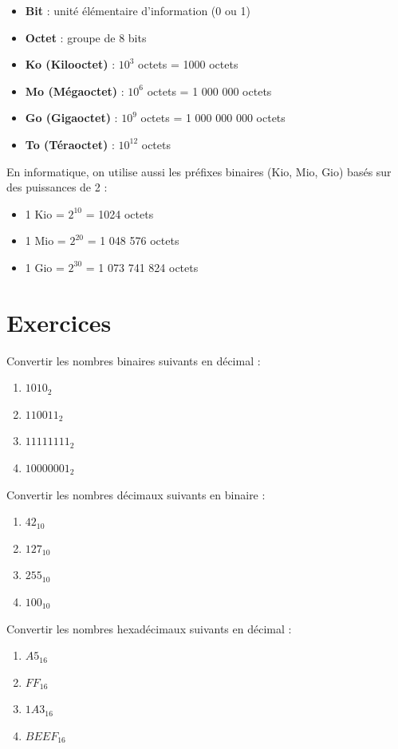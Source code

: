 \begin{definition}[Unités]
\begin{itemize}
    \item \textbf{Bit} : unité élémentaire d'information (0 ou 1)
    \item \textbf{Octet} : groupe de 8 bits
    \item \textbf{Ko (Kilooctet)} : $10^3$ octets = 1000 octets
    \item \textbf{Mo (Mégaoctet)} : $10^6$ octets = 1 000 000 octets
    \item \textbf{Go (Gigaoctet)} : $10^9$ octets = 1 000 000 000 octets
    \item \textbf{To (Téraoctet)} : $10^{12}$ octets
\end{itemize}
En informatique, on utilise aussi les préfixes binaires (Kio, Mio, Gio) basés sur des puissances de 2 :
\begin{itemize}
    \item 1 Kio = $2^{10}$ = 1024 octets
    \item 1 Mio = $2^{20}$ = 1 048 576 octets
    \item 1 Gio = $2^{30}$ = 1 073 741 824 octets
\end{itemize}
\end{definition}

\section{Exercices}


\exo{}
Convertir les nombres binaires suivants en décimal :
\begin{enumerate}
    \item $1010_2$
    \item $110011_2$
    \item $11111111_2$
    \item $10000001_2$
\end{enumerate}

\exo{}
Convertir les nombres décimaux suivants en binaire :
\begin{enumerate}
    \item $42_{10}$
    \item $127_{10}$
    \item $255_{10}$
    \item $100_{10}$
\end{enumerate}

\exo{}
Convertir les nombres hexadécimaux suivants en décimal :
\begin{enumerate}
    \item $A5_{16}$
    \item $FF_{16}$
    \item $1A3_{16}$
    \item $BEEF_{16}$
\end{enumerate}

